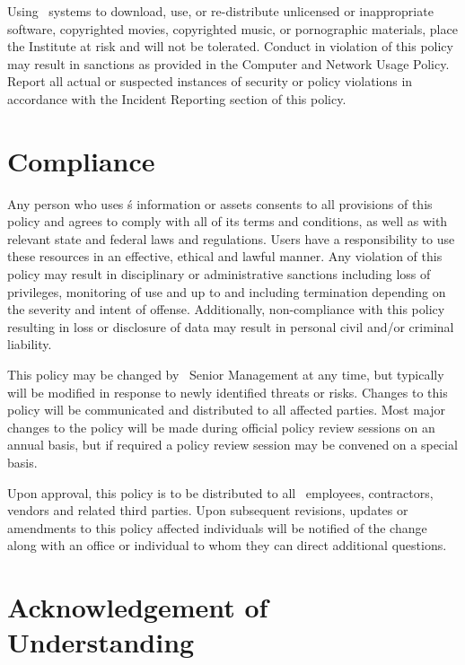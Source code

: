 \documentclass[sec]{policy}
\begin{document}
				Using \theOrganization\ systems to download, use, or re-distribute unlicensed or inappropriate software, copyrighted movies, copyrighted music, or pornographic materials, place the Institute at risk and will not be tolerated. Conduct in violation of this policy may result in sanctions as provided in the Computer and Network Usage Policy. Report all actual or suspected instances of security or policy violations in accordance with the Incident Reporting section of this policy.
				
		\section{Compliance}
				
			Any person who uses \theOrganization\'s information or assets consents to all provisions of this policy and agrees to comply with all of its terms and conditions, as well as with relevant state and federal laws and regulations.  Users have a responsibility to use these resources in an effective, ethical and lawful manner.  Any violation of this policy may result in disciplinary or administrative sanctions including loss of privileges, monitoring of use and up to and including termination depending on the severity and intent of offense.  Additionally, non-compliance with this policy resulting in loss or disclosure of data may result in personal civil and/or criminal liability.
				
				
			This policy may be changed by \theOrganization\ Senior Management at any time, but typically will be modified in response to newly identified threats or risks.  Changes to this policy will be communicated and distributed to all affected parties.  Most major changes to the policy will be made during official policy review sessions on an annual basis, but if required a policy review session may be convened on a special basis.
				
				
			Upon approval, this policy is to be distributed to all \theOrganization\ employees, contractors, vendors and related third parties.  Upon subsequent revisions, updates or amendments to this policy affected individuals will be notified of the change along with an office or individual to whom they can direct additional questions.
				
		\section{Acknowledgement of Understanding}
		
\end{document}
